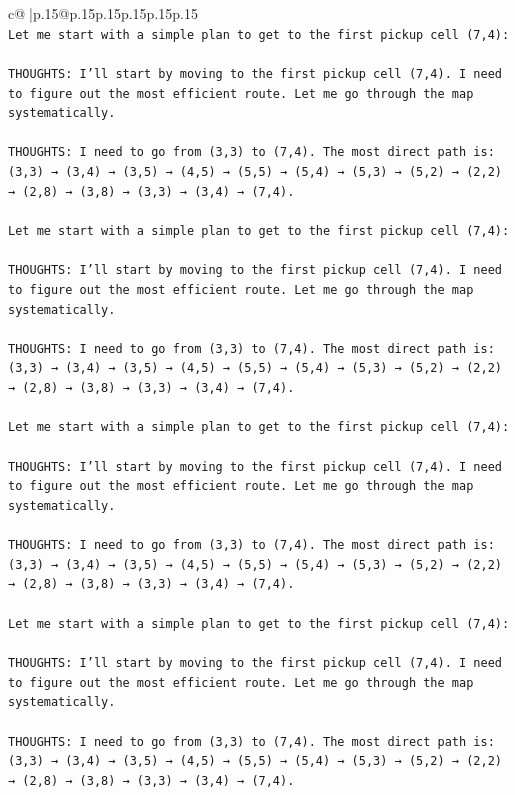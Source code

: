 \documentclass{article}
\begin{document}
{\begin{supertabular}{c@{$\;$}|p{.15\linewidth}@{}p{.15\linewidth}p{.15\linewidth}p{.15\linewidth}p{.15\linewidth}p{.15\linewidth}}
{{{\\ 
\texttt{Let me start with a simple plan to get to the first pickup cell (7,4):} \\
\\ 
\texttt{THOUGHTS: I'll start by moving to the first pickup cell (7,4). I need to figure out the most efficient route. Let me go through the map systematically.} \\
\\ 
\texttt{THOUGHTS: I need to go from (3,3) to (7,4). The most direct path is: (3,3) → (3,4) → (3,5) → (4,5) → (5,5) → (5,4) → (5,3) → (5,2) → (2,2) → (2,8) → (3,8) → (3,3) → (3,4) → (7,4).} \\
\\ 
\texttt{Let me start with a simple plan to get to the first pickup cell (7,4):} \\
\\ 
\texttt{THOUGHTS: I'll start by moving to the first pickup cell (7,4). I need to figure out the most efficient route. Let me go through the map systematically.} \\
\\ 
\texttt{THOUGHTS: I need to go from (3,3) to (7,4). The most direct path is: (3,3) → (3,4) → (3,5) → (4,5) → (5,5) → (5,4) → (5,3) → (5,2) → (2,2) → (2,8) → (3,8) → (3,3) → (3,4) → (7,4).} \\
\\ 
\texttt{Let me start with a simple plan to get to the first pickup cell (7,4):} \\
\\ 
\texttt{THOUGHTS: I'll start by moving to the first pickup cell (7,4). I need to figure out the most efficient route. Let me go through the map systematically.} \\
\\ 
\texttt{THOUGHTS: I need to go from (3,3) to (7,4). The most direct path is: (3,3) → (3,4) → (3,5) → (4,5) → (5,5) → (5,4) → (5,3) → (5,2) → (2,2) → (2,8) → (3,8) → (3,3) → (3,4) → (7,4).} \\
\\ 
\texttt{Let me start with a simple plan to get to the first pickup cell (7,4):} \\
\\ 
\texttt{THOUGHTS: I'll start by moving to the first pickup cell (7,4). I need to figure out the most efficient route. Let me go through the map systematically.} \\
\\ 
\texttt{THOUGHTS: I need to go from (3,3) to (7,4). The most direct path is: (3,3) → (3,4) → (3,5) → (4,5) → (5,5) → (5,4) → (5,3) → (5,2) → (2,2) → (2,8) → (3,8) → (3,3) → (3,4) → (7,4).} \\
}}}
\end{supertabular}}
\end{document}
